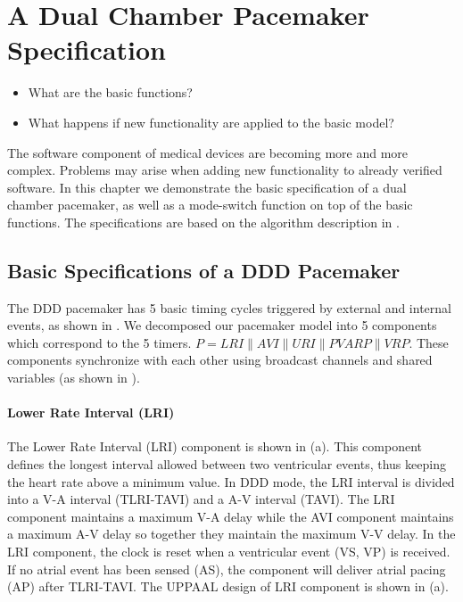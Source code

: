 \chapter{A Dual Chamber Pacemaker Specification}
\begin{itemize}
	\item What are the basic functions?
   \item What happens if new functionality are applied to the basic model?
\end{itemize}
The software component of medical devices are becoming more and more complex. Problems may arise when adding new functionality to already verified software. In this chapter we demonstrate the basic specification of a dual chamber pacemaker, as well as a mode-switch function on top of the basic functions. The specifications are based on the algorithm description in \cite{compass}.
\section{Basic Specifications of a DDD Pacemaker}
The DDD pacemaker has 5 basic timing cycles triggered by external and internal events, as shown in . We decomposed our pacemaker model into 5 components which correspond to the 5 timers. $P=LRI\| AVI\| URI\| PVARP\| VRP$. These components synchronize with each other using broadcast channels and shared variables (as shown in ). 

\subsubsection{Lower Rate Interval (LRI)}
The Lower Rate Interval (LRI) component is shown in (a). This component defines the longest interval allowed between two ventricular events, thus keeping the heart rate above a minimum value. In DDD mode, the LRI interval is divided into a V-A interval (TLRI-TAVI) and a A-V interval (TAVI). The LRI component maintains a maximum V-A delay while the AVI component maintains a maximum A-V delay so together they maintain the maximum V-V delay. In the LRI component, the clock is reset when a ventricular event \textsf{(VS, VP)} is received. If no atrial event has been sensed \textsf{(AS)}, the component will deliver atrial pacing \textsf{(AP)} after TLRI-TAVI. The UPPAAL design of LRI component is shown in (a).

